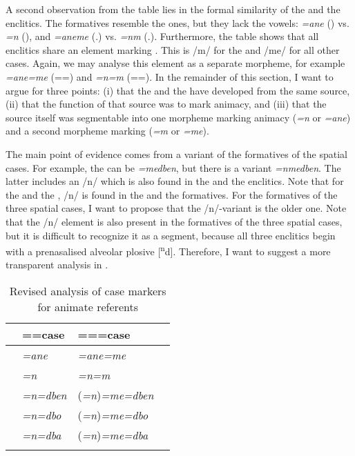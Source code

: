A second observation from the table lies in the formal similarity of the  and the   enclitics. The  formatives resemble the  ones, but they lack the vowels: \emph{=ane} (\Poss) vs. \emph{=n} (\Dat), and \emph{=aneme} (\Poss.\Nsg) vs. \emph{=nm} (\Dat.\Nsg). Furthermore, the table shows that all  enclitics share an element marking  . This is /m/ for the  and /me/ for all other cases. Again, we may analyse this element as a separate morpheme, for example \emph{=ane=me} (=\Poss={\Nsg}) and \emph{=n=m} (=\Dat={\Nsg}). In the remainder of this section, I want to argue for three points: (i) that the  and the  have developed from the same source, (ii) that the function of that source was to mark animacy, and (iii) that the source itself was segmentable into one morpheme marking animacy (\emph{=n} or \emph{=ane}) and a second morpheme marking   (\emph{=m} or \emph{=me}).

The main point of evidence comes from a variant of the  formatives of the spatial cases. For example, the  can be \emph{=medben}, but there is a variant \emph{=nmedben}. The latter includes an /n/ which is also found in the  and the  enclitics. Note that for the  and the , /n/ is found in the  and the  formatives. For the  formatives of the three spatial cases, I want to propose that the /n/-variant is the older one. Note that the /n/ element is also present in the  formatives of the three spatial cases, but it is difficult to recognize it as a segment, because all three  enclitics begin with a prenasalised alveolar plosive [\textsuperscript{n}d]. Therefore, I want to suggest a more transparent analysis in .

\begin{table}
\begin{center}
\caption{Revised analysis of case markers for animate referents} 
\label{casediscussionshist} 
	\begin{tabularx}{.7\textwidth}{XXll}	
		\lsptoprule
		&=\Anim={case}&=\Anim={\Nsg}={case}\\ \midrule
		{\Poss}&\emph{=ane}&\emph{=ane=me}\\ 
		{\Dat}&\emph{=n}&\emph{=n=m}\\ 
		{\Loc}&\emph{=n=dben}&(\emph{=n})\emph{=me=dben}\\ 
		{\All}&\emph{=n=dbo}&(\emph{=n})\emph{=me=dbo}\\ 
		{\Abl}&\emph{=n=dba}&(\emph{=n})\emph{=me=dba}\\ 
		\lspbottomrule
	\end{tabularx}
\end{center}
\end{table}%

